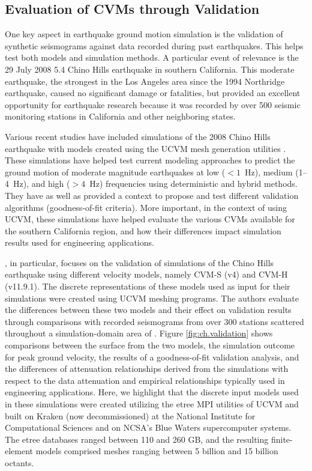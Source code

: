 
\subsection{Evaluation of CVMs through Validation}

One key aspect in earthquake ground motion simulation is the validation of synthetic seismograms against data recorded during past earthquakes. This helps test both models and simulation methods. A particular event of relevance is the 29 July 2008  5.4 Chino Hills earthquake in southern California. This moderate earthquake, the strongest in the Los Angeles area since the 1994 Northridge earthquake, caused no significant damage or fatalities, but provided an excellent opportunity for earthquake research because it was recorded by over 500 seismic monitoring stations in California and other neighboring states. 

Various recent studies have included simulations of the 2008 Chino Hills earthquake with models created using the UCVM mesh generation utilities \citep[e.g.,][]{Olsen_2010_SRL, Taborda_2013_BSSA, Taborda_2014_BSSA}. These simulations have helped test current modeling approaches to predict the ground motion of moderate magnitude earthquakes at low ($<1$~Hz), medium (1--4~Hz), and high ($>4$~Hz) frequencies using deterministic and hybrid methods. They have as well as provided a context to propose and test different validation algorithms (goodness-of-fit criteria). More important, in the context of using UCVM, these simulations have helped evaluate the various CVMs available for the southern California region, and how their differences impact simulation results used for engineering applications.

\citet{Taborda_2014_BSSA}, in particular, focuses on the validation of simulations of the Chino Hills earthquake using different velocity models, namely CVM-S (v4) and CVM-H (v11.9.1). The discrete representations of these models used as input for their simulations were created using UCVM meshing programs. The authors evaluate the differences between these two models and their effect on validation results through comparisons with recorded seismograms from over 300 stations scattered throughout a simulation-domain area of . Figure \ref{fig:ch.validation} shows comparisons between the surface \vs{} from the two models, the simulation outcome for peak ground velocity, the results of a goodness-of-fit validation analysis, and the differences of attenuation relationships derived from the simulations with respect to the data attenuation and empirical relationships typically used in engineering applications. Here, we highlight that the discrete input models used in these simulations were created utilizing the etree MPI utilities of UCVM and built on Kraken (now decommissioned) at the National Institute for Computational Sciences and on NCSA's Blue Waters supercomputer systems. The etree databases ranged between 110 and 260 GB, and the resulting finite-element models comprised meshes ranging between 5 billion and 15 billion octants.



